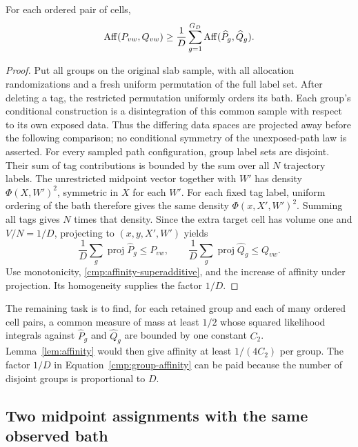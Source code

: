 \begin{lemma}\label{lem:tag-normalization}
For each ordered pair of cells,
\begin{equation}\label{cmp:group-affinity}
 \operatorname{Aff}(P_{vw},Q_{vw})
 \ge\frac1D\sum_{g=1}^{G_D}\operatorname{Aff}(\widehat P_g,\widehat Q_g).
\end{equation}
\end{lemma}
\begin{proof}
Put all groups on the original slab sample, with all allocation
randomizations and a fresh uniform permutation of the full label set.
After deleting a tag, the restricted permutation uniformly orders its bath.
Each group's conditional construction is a disintegration of this common
sample with respect to its own exposed data. Thus the differing data spaces
are projected away before the following comparison; no conditional symmetry
of the unexposed-path law is asserted.
For every sampled path configuration, group label sets are disjoint. Their
sum of tag contributions is bounded by the sum over all $N$ trajectory
labels. The unrestricted midpoint vector together with $W'$ has density
$\Phi(X,W')^2$, symmetric in $X$ for each $W'$.
For each fixed tag label, uniform ordering of the bath therefore gives the
same density $\Phi(x,X',W')^2$. Summing all tags gives $N$ times that density.
Since the extra target cell has volume one and $V/N=1/D$, projecting to
$(x,y,X',W')$ yields
\[
 \frac1D\sum_g\operatorname{proj}\widehat P_g\le P_{vw},
 \qquad
 \frac1D\sum_g\operatorname{proj}\widehat Q_g\le Q_{vw}.
\]
Use monotonicity, \eqref{cmp:affinity-superadditive}, and the increase of
affinity under projection. Its homogeneity supplies the factor $1/D$.
\end{proof}

The remaining task is to find, for each retained group and each of many
ordered cell pairs, a common measure of mass at least $1/2$ whose squared
likelihood integrals against $\widehat P_g$ and $\widehat Q_g$ are bounded
by one constant $C_2$. Lemma~\ref{lem:affinity} would then give affinity at
least $1/(4C_2)$ per group. The factor $1/D$ in
Equation~\eqref{cmp:group-affinity} can be paid because the number of
disjoint groups is proportional to $D$.

\subsection{Two midpoint assignments with the same observed bath}

